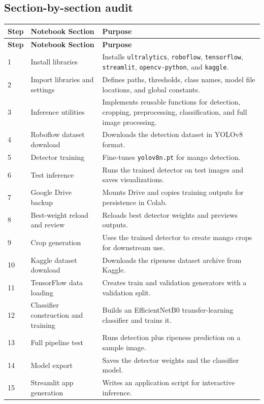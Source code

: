 \documentclass[12pt,a4paper]{article}
\begin{document}
\subsection{Section-by-section audit}
\begin{longtable}{p{} p{} p{}}
\toprule
\textbf{Step} & \textbf{Notebook Section} & \textbf{Purpose} \\
\midrule
\endfirsthead
\toprule
\textbf{Step} & \textbf{Notebook Section} & \textbf{Purpose} \\
\midrule
\endhead
1 & Install libraries & Installs \texttt{ultralytics}, \texttt{roboflow}, \texttt{tensorflow}, \texttt{streamlit}, \texttt{opencv-python}, and \texttt{kaggle}. \\
2 & Import libraries and settings & Defines paths, thresholds, class names, model file locations, and global constants. \\
3 & Inference utilities & Implements reusable functions for detection, cropping, preprocessing, classification, and full image processing. \\
4 & Roboflow dataset download & Downloads the detection dataset in YOLOv8 format. \\
5 & Detector training & Fine-tunes \texttt{yolov8n.pt} for mango detection. \\
6 & Test inference & Runs the trained detector on test images and saves visualizations. \\
7 & Google Drive backup & Mounts Drive and copies training outputs for persistence in Colab. \\
8 & Best-weight reload and review & Reloads best detector weights and previews outputs. \\
9 & Crop generation & Uses the trained detector to create mango crops for downstream use. \\
10 & Kaggle dataset download & Downloads the ripeness dataset archive from Kaggle. \\
11 & TensorFlow data loading & Creates train and validation generators with a validation split. \\
12 & Classifier construction and training & Builds an EfficientNetB0 transfer-learning classifier and trains it. \\
13 & Full pipeline test & Runs detection plus ripeness prediction on a sample image. \\
14 & Model export & Saves the detector weights and the classifier model. \\
15 & Streamlit app generation & Writes an application script for interactive inference. \\
\bottomrule
\end{longtable}
\end{document}
